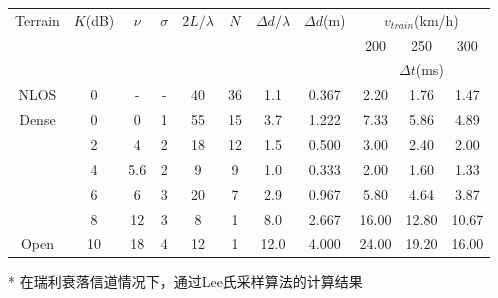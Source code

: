 \begin{table}[!htp]
\renewcommand{\arraystretch}{1}
\centering
\begin{threeparttable}[b]
\begin{tabular}{c|c|c|c|c|c|c|c|c|c|c}
\hline
\multicolumn{1}{c|}{\multirow{3}{*}{Terrain}} & \multicolumn{1}{c|}{\multirow{3}{*}{$K$(dB)}} & \multicolumn{1}{c|}{\multirow{3}{*}{$\nu$}} & \multicolumn{1}{c|}{\multirow{3}{*}{$\sigma$}} & \multicolumn{1}{c|}{\multirow{3}{*}{$2L/\lambda$}} & \multicolumn{1}{c|}{\multirow{3}{*}{$N$}} & \multicolumn{1}{c|}{\multirow{3}{*}{$\Delta d/\lambda$}} & \multicolumn{1}{c|}{\multirow{3}{*}{$\Delta d$(m)}} & \multicolumn{3}{c}{$v_{train}$(km/h)}\\
\cline{9-11}
\multicolumn{1}{c|}{} & \multicolumn{1}{c|}{} & \multicolumn{1}{c|}{} & \multicolumn{1}{c|}{} & \multicolumn{1}{c|}{} & \multicolumn{1}{c|}{} & \multicolumn{1}{c|}{} & \multicolumn{1}{c|}{} & 200 & 250 & 300\\
\cline{9-11}
\multicolumn{1}{c|}{}& \multicolumn{1}{c|}{} & \multicolumn{1}{c|}{} & \multicolumn{1}{c|}{} & \multicolumn{1}{c|}{} & \multicolumn{1}{c|}{} & \multicolumn{1}{c|}{} & \multicolumn{1}{c|}{} & \multicolumn{3}{c}{$\Delta t$(ms)}\\
\cline{1-11}
NLOS\tnote{*}  &  0 &    - & - & 40 & 36 &  1.1 & 0.367 &  2.20 &  1.76 &  1.47\\
\hline
Dense &  0 &   0 & 1 & 55 & 15 &  3.7 & 1.222 &  7.33 &  5.86 &  4.89\\
      &  2 &   4 & 2 & 18 & 12 &  1.5 & 0.500 &  3.00 &  2.40 &  2.00\\
      &  4 & 5.6 & 2 &  9 &  9 &  1.0 & 0.333 &  2.00 &  1.60 &  1.33\\
      &  6 &   6 & 3 & 20 &  7 &  2.9 & 0.967 &  5.80 &  4.64 &  3.87\\
      &  8 &  12 & 3 &  8 &  1 &  8.0 & 2.667 & 16.00 & 12.80 & 10.67\\
Open  & 10 &  18 & 4 & 12 &  1 & 12.0 & 4.000 & 24.00 & 19.20 & 16.00\\
\hline
\end{tabular}
\begin{tablenotes}
\item[*] \small 在瑞利衰落信道情况下，通过Lee氏采样算法的计算结果
\end{tablenotes}
\end{threeparttable}
\end{table}


